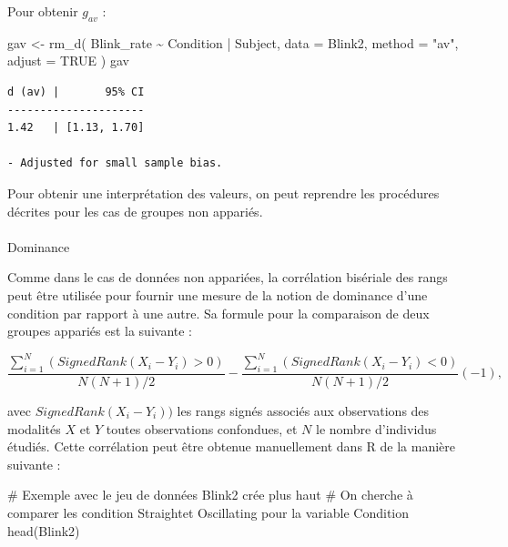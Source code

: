 \documentclass[
  letterpaper,
]{book}
\makeatletter
\let\oldparagraph\paragraph
\renewcommand{\paragraph}{
    \@ifstar
      \xxxParagraphStar
      \xxxParagraphNoStar
  }
\newcommand{\xxxParagraphStar}[1]{\oldparagraph*{#1}\mbox{}}
\newcommand{\xxxParagraphNoStar}[1]{\oldparagraph{#1}\mbox{}}
\newenvironment{Shaded}{\begin{snugshade}}{\end{snugshade}}
\newcommand{\AttributeTok}[1]{\textcolor[rgb]{0.40,0.45,0.13}{#1}}
\newcommand{\CommentTok}[1]{\textcolor[rgb]{0.37,0.37,0.37}{#1}}
\newcommand{\ConstantTok}[1]{\textcolor[rgb]{0.56,0.35,0.01}{#1}}
\newcommand{\FunctionTok}[1]{\textcolor[rgb]{0.28,0.35,0.67}{#1}}
\newcommand{\NormalTok}[1]{\textcolor[rgb]{0.00,0.23,0.31}{#1}}
\newcommand{\OtherTok}[1]{\textcolor[rgb]{0.00,0.23,0.31}{#1}}
\newcommand{\SpecialCharTok}[1]{\textcolor[rgb]{0.37,0.37,0.37}{#1}}
\newcommand{\StringTok}[1]{\textcolor[rgb]{0.13,0.47,0.30}{#1}}
\makeatother
\begin{document}
Pour obtenir \(g_{av}\) :

\begin{Shaded}
\begin{Highlighting}[]
\NormalTok{gav }\OtherTok{\textless{}{-}}
  \FunctionTok{rm\_d}\NormalTok{(}
\NormalTok{    Blink\_rate }\SpecialCharTok{\textasciitilde{}}\NormalTok{ Condition }\SpecialCharTok{|}\NormalTok{ Subject,}
    \AttributeTok{data =}\NormalTok{ Blink2,}
    \AttributeTok{method =} \StringTok{"av"}\NormalTok{,}
    \AttributeTok{adjust =} \ConstantTok{TRUE}
\NormalTok{  )}
\NormalTok{gav}
\end{Highlighting}
\end{Shaded}

\begin{verbatim}
d (av) |       95% CI
---------------------
1.42   | [1.13, 1.70]

- Adjusted for small sample bias.
\end{verbatim}

Pour obtenir une interprétation des valeurs, on peut reprendre les
procédures décrites pour les cas de groupes non appariés.

\paragraph{Dominance}\label{dominance-2}

Comme dans le cas de données non appariées, la corrélation bisériale des
rangs peut être utilisée pour fournir une mesure de la notion de
dominance d'une condition par rapport à une autre. Sa formule pour la
comparaison de deux groupes appariés est la suivante :

\[
\frac{\sum_{i=1}^{N} (SignedRank(X_{i} - Y_{i}) > 0)}{N (N+1) / 2} - \frac{\sum_{i=1}^{N} (SignedRank(X_{i} - Y_{i}) < 0)}{N (N+1) / 2}(-1),
\]

avec \(SignedRank(X_{i} - Y_{i}))\) les rangs signés associés aux
observations des modalités \(X\) et \(Y\) toutes observations
confondues, et \(N\) le nombre d'individus étudiés. Cette corrélation
peut être obtenue manuellement dans R de la manière suivante :

\begin{Shaded}
\begin{Highlighting}[]
\CommentTok{\# Exemple avec le jeu de données \textasciigrave{}Blink2\textasciigrave{} crée plus haut}
\CommentTok{\# On cherche à comparer les condition \textasciigrave{}Straight\textasciigrave{}et \textasciigrave{}Oscillating\textasciigrave{} pour la variable \textasciigrave{}Condition\textasciigrave{} }
\FunctionTok{head}\NormalTok{(Blink2)}
\end{Highlighting}
\end{Shaded}
\end{document}
